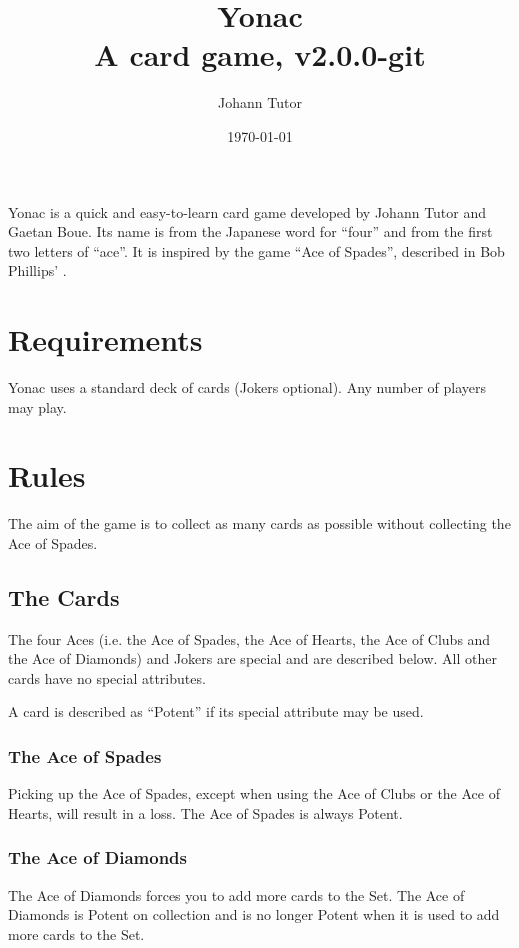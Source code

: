\documentclass{article}
\newcommand\theversion{2.0.0-git}
\begin{document}
\title{Yonac\\ \large A card game, v\theversion}
\author{Johann Tutor}
\date{\today}
\maketitle

Yonac is a quick and easy-to-learn card game developed by Johann Tutor
and Gaetan Boue. Its name is from the Japanese word for ``four'' and
from the first two letters of ``ace''. It is inspired by the game ``Ace
of Spades'', described in Bob Phillips'
.

\tableofcontents

\newpage

\section{Requirements}

Yonac uses a standard deck of cards (Jokers optional). Any number of
players may play.

\section{Rules}

The aim of the game is to collect as many cards as possible without
collecting the Ace of Spades.

\subsection{The Cards}
\label{sec:cards}

The four Aces (i.e. the Ace of Spades, the Ace of Hearts, the Ace of Clubs and
the Ace of Diamonds) and Jokers are special and are described below. All other
cards have no special attributes.

A card is described as ``Potent'' if its special attribute may be used.

\subsubsection{The Ace of Spades}
Picking up the Ace of Spades, except when using the Ace of Clubs or the
Ace of Hearts, will result in a loss. The Ace of Spades is always Potent.

\subsubsection{The Ace of Diamonds}
The Ace of Diamonds forces you to add more cards to the Set. The Ace of
Diamonds is Potent on collection and is no longer Potent when it is used
to add more cards to the Set.
\end{document}

